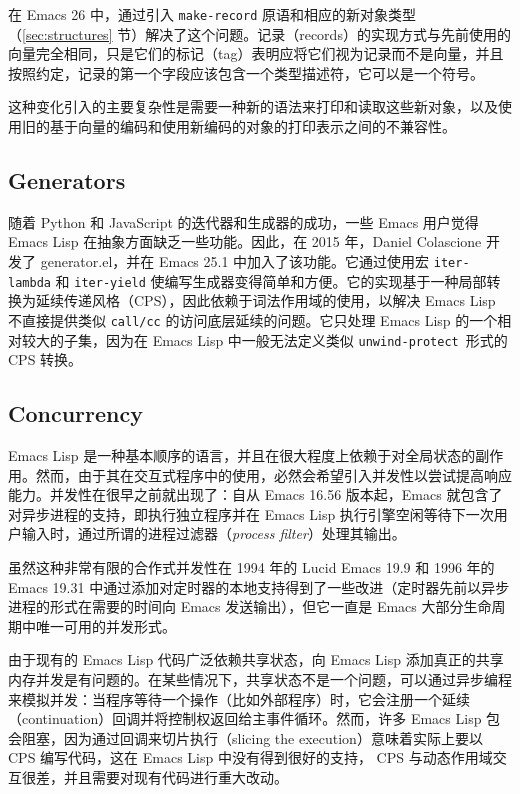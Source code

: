 \documentclass[format=acmsmall,screen]{acmart}
\begin{document}
在 Emacs 26 中，通过引入 \texttt{make-record} 原语和相应的新对象类型（\ref{sec:structures} 节）解决了这个问题。记录（records）的实现方式与先前使用的向量完全相同，只是它们的标记（tag）表明应将它们视为记录而不是向量，并且按照约定，记录的第一个字段应该包含一个类型描述符，它可以是一个符号。

这种变化引入的主要复杂性是需要一种新的语法来打印和读取这些新对象，以及使用旧的基于向量的编码和使用新编码的对象的打印表示之间的不兼容性。

\subsection{Generators}
\label{sec:generators}

随着 Python 和 JavaScript 的迭代器和生成器的成功，一些 Emacs 用户觉得 Emacs Lisp 在抽象方面缺乏一些功能。因此，在 2015 年，Daniel Colascione 开发了 generator.el，并在 Emacs 25.1 中加入了该功能。它通过使用宏 \texttt{iter-lambda} 和 \texttt{iter-yield} 使编写生成器变得简单和方便。它的实现基于一种局部转换为延续传递风格（CPS），因此依赖于词法作用域的使用，以解决 Emacs Lisp 不直接提供类似 \texttt{call/cc} 的访问底层延续的问题。它只处理 Emacs Lisp 的一个相对较大的子集，因为在 Emacs Lisp 中一般无法定义类似 \texttt{unwind-protect}~\cite{HaynesFriedman1987}形式的 CPS 转换。

\subsection{Concurrency}
\label{sec:concurrency}

Emacs Lisp 是一种基本顺序的语言，并且在很大程度上依赖于对全局状态的副作用。然而，由于其在交互式程序中的使用，必然会希望引入并发性以尝试提高响应能力。并发性在很早之前就出现了：自从 Emacs 16.56 版本起，Emacs 就包含了对异步进程的支持，即执行独立程序并在 Emacs Lisp 执行引擎空闲等待下一次用户输入时，通过所谓的进程过滤器（\emph{process filter}）处理其输出。

虽然这种非常有限的合作式并发性在 1994 年的 Lucid Emacs 19.9 和 1996 年的 Emacs 19.31 中通过添加对定时器的本地支持得到了一些改进（定时器先前以异步进程的形式在需要的时间向 Emacs 发送输出），但它一直是 Emacs 大部分生命周期中唯一可用的并发形式。

由于现有的 Emacs Lisp 代码广泛依赖共享状态，向 Emacs Lisp 添加真正的共享内存并发是有问题的。在某些情况下，共享状态不是一个问题，可以通过异步编程来模拟并发：当程序等待一个操作（比如外部程序）时，它会注册一个延续（continuation）回调并将控制权返回给主事件循环。然而，许多 Emacs Lisp 包会阻塞，因为通过回调来切片执行（slicing the execution）意味着实际上要以 CPS 编写代码，这在 Emacs Lisp 中没有得到很好的支持， CPS 与动态作用域交互很差，并且需要对现有代码进行重大改动。
\end{document}
